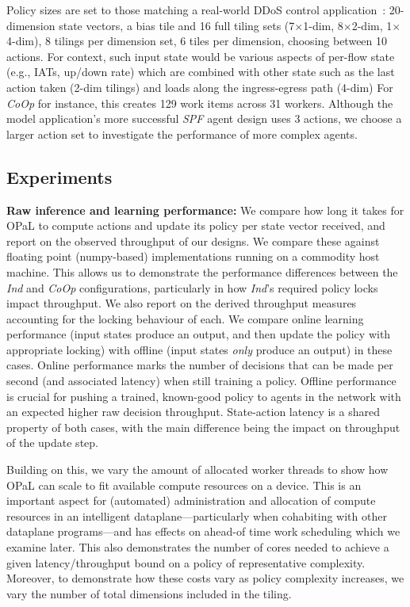 \documentclass[sigconf,natbib=false]{acmart}
\newcommand{\fakepara}[1]{\noindent\textbf{#1:}}
\newcommand{\approachshort}{OPaL}
\newcommand{\Coopfw}{\emph{CoOp}}
\newcommand{\coopfw}{\Coopfw}
\newcommand{\Indfw}{\emph{Ind}}
\newcommand{\indfw}{\Indfw}
\begin{document}
Policy sizes are set to those matching a real-world DDoS control application~\parencite{DBLP:journals/tnsm/SimpsonRP20}: 20-dimension state vectors, a bias tile and 16 full tiling sets (7$\times$1-dim, 8$\times$2-dim, 1$\times$4-dim), 8 tilings per dimension set, 6 tiles per dimension, choosing between 10 actions.
For context, such input state would be various aspects of per-flow state (e.g., IATs, up/down rate) which are combined with other state such as the last action taken (2-dim tilings) and loads along the ingress-egress path (4-dim)
For \Coopfw{} for instance, this creates \num{129} work items across \num{31} workers.
Although the model application's more successful \emph{SPF} agent design uses 3 actions, we choose a larger action set to investigate the performance of more complex agents.

\subsection{Experiments}

\fakepara{Raw inference and learning performance}
We compare how long it takes for \approachshort{} to compute actions and update its policy per state vector received, and report on the observed throughput of our designs.
We compare these against floating point (numpy-based) implementations running on a commodity host machine.
This allows us to demonstrate the performance differences between the \indfw{} and \coopfw{} configurations, particularly in how \indfw's required policy locks impact throughput.
We also report on the derived throughput measures accounting for the locking behaviour of each.
We compare online learning performance (input states produce an output, and then update the policy with appropriate locking) with offline (input states \emph{only} produce an output) in these cases.
Online performance marks the number of decisions that can be made per second (and associated latency) when still training a policy.
Offline performance is crucial for pushing a trained, known-good policy to agents in the network with an expected higher raw decision throughput.
State-action latency is a shared property of both cases, with the main difference being the impact on throughput of the update step.

Building on this, we vary the amount of allocated worker threads to show how \approachshort{} can scale to fit available compute resources on a device.
This is an important aspect for (automated) administration and allocation of compute resources in an intelligent dataplane---particularly when cohabiting with other dataplane programs---and has effects on ahead-of time work scheduling which we examine later.
This also demonstrates the number of cores needed to achieve a given latency/throughput bound on a policy of representative complexity.
Moreover, to demonstrate how these costs vary as policy complexity increases, we vary the number of total dimensions included in the tiling.
\end{document}
